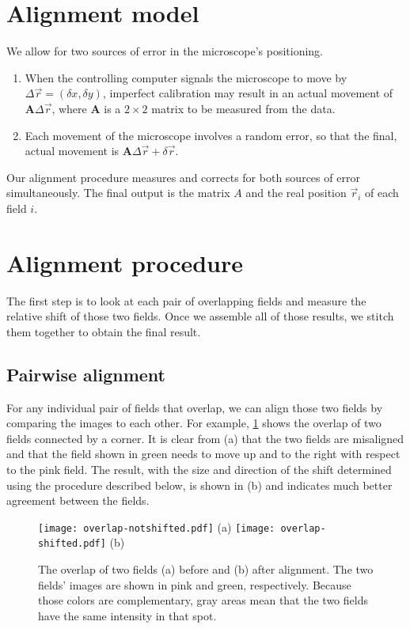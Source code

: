 \documentclass{article}
\newcommand{\matrixbold}[1]{\mathbf{#1}}
\begin{document}
\section{Alignment model}

We allow for two sources of error in the microscope's positioning.
\begin{enumerate}
\item When the controlling computer signals the microscope to move by $\Delta \vec{r}=(\delta x, \delta y)$, imperfect calibration may result in an actual movement of $\matrixbold{A}\Delta\vec{r}$, where $\matrixbold{A}$ is a $2\times2$ matrix to be measured from the data. \label{systematicerror}
\item Each movement of the microscope involves a random error, so that the final, actual movement is $\matrixbold{A}\Delta\vec{r}+\delta\vec{r}$. \label{randomerror}
\end{enumerate}
Our alignment procedure measures and corrects for both sources of error simultaneously.  The final output is the matrix $A$ and the real position $\vec{r}_i$ of each field $i$.

\section{Alignment procedure}

The first step is to look at each pair of overlapping fields and measure the relative shift of those two fields.  Once we assemble all of those results, we stitch them together to obtain the final result.

\subsection{Pairwise alignment}

For any individual pair of fields that overlap, we can align those two fields by comparing the images to each other.  For example, \cref{fig:overlap} shows the overlap of two fields connected by a corner.  It is clear from (a) that the two fields are misaligned and that the field shown in green needs to move up and to the right with respect to the pink field.  The result, with the size and direction of the shift determined using the procedure described below, is shown in (b) and indicates much better agreement between the fields.

\begin{figure}[ht]
	\centering
	\begin{multicols}{2}
	\texttt{[image: overlap-notshifted.pdf]} (a)
	\texttt{[image: overlap-shifted.pdf]} (b)
	\end{multicols}
	\caption{The overlap of two fields (a) before and (b) after alignment.  The two fields' images are shown in pink and green, respectively.  Because those colors are complementary, gray areas mean that the two fields have the same intensity in that spot.}
	\label{fig:overlap}
\end{figure}
\end{document}
